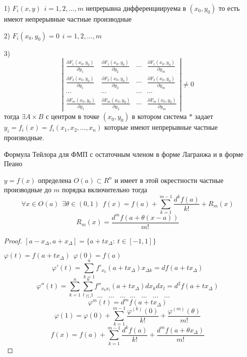 \begin{theorem}
  1) $F_i(x, y) ~~ i = 1,2, \ldots, m$ непрерывна дифференциируема в
  $(x_0, y_0)$ то есть имеют непрерывные частные производные

  2) $F_i(x_0, y_0) = 0 ~~ i = 1,2, \ldots, m$

  3)
  $$
  \left|
  \begin{array}{cccc}
    \frac{\partial F_1(x_0, y_0)}{\partial y_1} &
    \frac{\partial F_1(x_0, y_0)}{\partial y_2} &
    \cdots &
    \frac{\partial F_1(x_0, y_0)}{\partial y_m} \\

    \frac{\partial F_2(x_0, y_0)}{\partial y_1} &
    \frac{\partial F_2(x_0, y_0)}{\partial y_2} &
    \cdots &
    \frac{\partial F_2(x_0, y_0)}{\partial y_m} \\

    \cdots & \cdots &\cdots &\cdots \\

    \frac{\partial F_m(x_0, y_0)}{\partial y_1} &
    \frac{\partial F_m(x_0, y_0)}{\partial y_2} &
    \cdots &
    \frac{\partial F_m(x_0, y_0)}{\partial y_m}
  \end{array}
  \right| \not= 0
  $$
  тогда $\exists A \times B$ с центром в точке $(x_0, y_0)$
  в котором система $*$ задает
  $y_i = f_i(x) = f_i(x_1, x_2, \ldots, x_n)$ которые имеют непрерывные частные
  производные.
\end{theorem}

\begin{title}[\Large]
  Формула Тейлора для ФМП с остаточным членом в форме Лагранжа и в форме Пеано
\end{title}

\begin{theorem}
  $y = f(x)$ определена $O(a) \subset R^n$ и имеет в этой окрестности частные
  производные до $m$ порядка включительно тогда
  $$
  \forall x \in O(a) ~~ \exists \theta \in (0, 1) ~~
  f(x) = f(a) + \sum_{k=1}^{m-1} \frac{d^k f(a)}{k!} + R_m(x)
  $$
  $$
  R_m(x) = \frac{d^m f(a + \theta(x-a))}{m!}
  $$
\end{theorem}

\begin{proof}
  $[a - x_{\Delta}, a + x_{\Delta}] = \{ a + tx_{\Delta}: ~ t \in [-1, 1] \}$

  $\varphi(t) = f(a + tx_{\Delta}) ~~ \varphi(0) = f(a)$
  $$
  \varphi'(t) = \sum_{k=1}^n f'_{x_k}(a + tx_{\Delta})x_{\Delta k} =
  df(a + tx_{\Delta})
  $$
  $$
  \varphi''(t) = \sum_{k=1}^n \sum_{l=1}^n f''_{x_k x_l}
  (a + tx_{\Delta})dx_k dx_l = d^2f(a + tx_{\Delta})
  $$
  $$
  \cdots ~~~~ \cdots ~~~~\cdots ~~~~\cdots ~~~ \cdots ~~~~ \cdots ~~~~
  \cdots ~~~~\cdots
  $$
  $$
  \varphi^m(t) = d^m f(a + tx_{\Delta})
  $$
  $$
  \varphi(1) = \varphi(0) + \sum_{k=1}^{m-1} \frac{\varphi^{(k)}(0)}{k!} +
  \frac{\varphi^{(m)}(\theta)}{m!}
  $$
  $$
  f(x) = f(a) + \sum_{k=1}^{m-1} \frac{d^k f(a)}{k!} +
  \frac{d^m f(a + \theta x_{\Delta})}{m!}
  $$
\end{proof}

